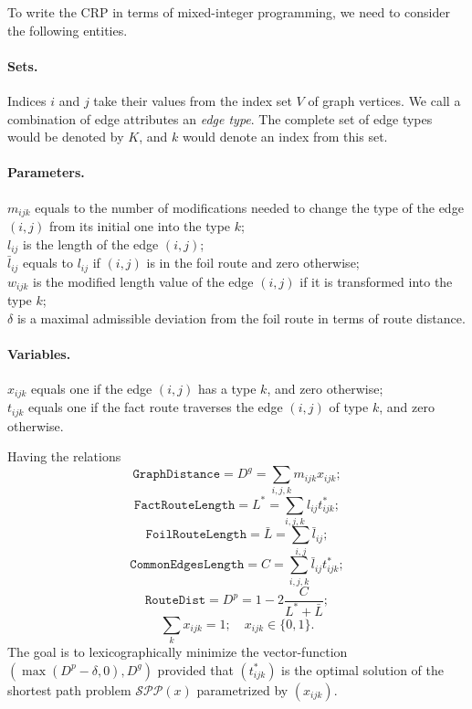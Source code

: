 \documentclass{article}
\begin{document}
To write the CRP in terms of mixed-integer programming, we need to consider the following entities.

\paragraph{Sets.} Indices $i$ and $j$ take their values from the index set $V$ of graph vertices.
We call a combination of edge attributes an \textit{edge type}. 
The complete set of edge types would be denoted by $K$, and $k$ would denote an index from this set.
\paragraph{Parameters.} $m_{ijk}$ equals to the number of modifications needed to change the type of the edge $(i, j)$ from its initial one into the type $k$;\\
$l_{ij}$ is the length of the edge $(i, j)$;\\
$\bar{l}_{ij}$ equals to $l_{ij}$ if $(i, j)$ is in the foil route and zero otherwise;\\
$w_{ijk}$ is the modified length value of the edge $(i, j)$ if it is transformed into the type $k$;\\
$\delta$ is a maximal admissible deviation from the foil route in terms of route distance.
\paragraph{Variables.}
$x_{ijk}$ equals one if the edge $(i, j)$ has a type $k$, and zero otherwise;\\
$t_{ijk}$ equals one if the fact route traverses the edge $(i, j)$ of type $k$, and zero otherwise.

Having the relations
\begin{equation}
\label{eq:1}
	\mathtt{GraphDistance} = D^g = \sum_{i, j, k} m_{ijk} x_{ijk};
\end{equation}
\begin{equation}
\label{eq:2}
	\mathtt{FactRouteLength} = L^* = \sum_{i, j, k} l_{ij}t^*_{ijk};
\end{equation}
\begin{equation}
\label{eq:3}
	\mathtt{FoilRouteLength} = \bar{L} = \sum_{i, j} \bar{l}_{ij};
\end{equation}
\begin{equation}
\label{eq:4}
    \mathtt{CommonEdgesLength} = C = \sum_{i, j, k} \bar{l}_{ij} t^*_{ijk};
\end{equation}
\begin{equation}
\label{eq:5}
	\mathtt{RouteDist} = D^p = 1 - 2\frac{C}{L^* + \bar{L}};
\end{equation}
\begin{equation}
\label{eq:6}
	\sum_k x_{ijk} = 1;\quad
	x_{ijk}\in \{0, 1\}.
\end{equation}
The goal is to lexicographically minimize the vector-function $(\max(D^p - \delta, 0), D^g)$ provided that $(t^*_{ijk})$ is the optimal solution of the shortest path problem $\mathcal{SPP}(x)$ parametrized by $(x_{ijk})$.
\end{document}
